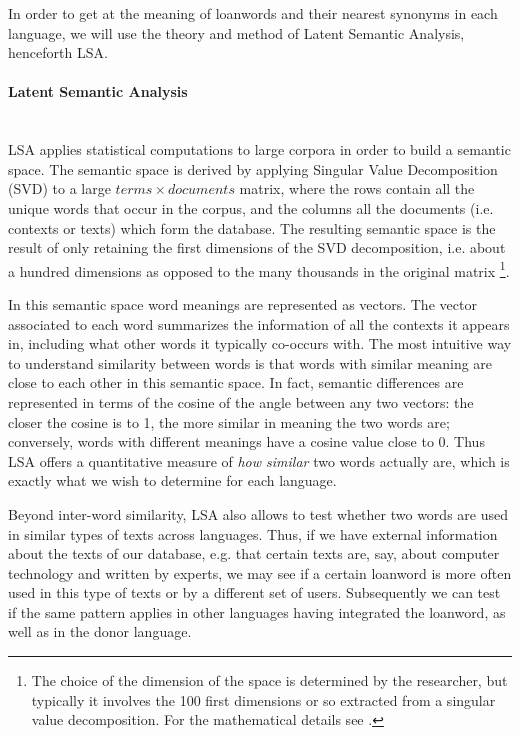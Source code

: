 \documentclass[a4paper]{article}
\begin{document}
In order to get at the meaning of loanwords and their nearest synonyms in each language, we will use the theory and method of Latent Semantic Analysis, henceforth LSA.

\paragraph{Latent Semantic Analysis} \hspace{0pt} \\
LSA  \citep{Deerwester1990,Landauer1998,Dumais2004}  applies statistical computations to large corpora in order to build a semantic space.
The semantic space is derived by applying Singular Value Decomposition (SVD) to a large $ terms \times documents$ matrix, where the rows contain all the unique words that occur in the corpus, and the columns all the documents (i.e. contexts or texts) which form the database.
The resulting semantic space is the result of only retaining the first dimensions of the SVD decomposition, i.e. about a hundred dimensions as opposed to the many thousands in the original matrix%
\footnote{The choice of the dimension of the space is determined by the researcher, but typically it involves the 100 first dimensions or so extracted from a singular value decomposition. For the mathematical details see \citet{Deerwester1990}.}.

In this semantic space word meanings are represented as vectors.
The vector associated to each word summarizes the information of all the contexts it appears in, including what other words it typically co-occurs with.
The most intuitive way to understand similarity between words is that words with similar meaning are close to each other in this semantic space.
In fact, semantic differences are represented in terms of the cosine of the angle between any two vectors: the closer the cosine is to 1, the more similar in meaning the two words are; conversely, words with different meanings have a cosine value close to 0. 
Thus LSA offers a quantitative measure of \emph{how similar} two words actually are, which is exactly what we wish to determine for each language.

Beyond inter-word similarity, LSA also allows  to test whether two words are used in similar types of texts across languages.
Thus, if we have external information about the texts of our database, e.g. that certain texts are, say, about computer technology and written by experts, we may see if a certain loanword is more often used in this type of texts or by a different set of users.
Subsequently we can test if the same pattern applies in other languages having integrated the loanword, as well as in the donor language. 
\end{document}
